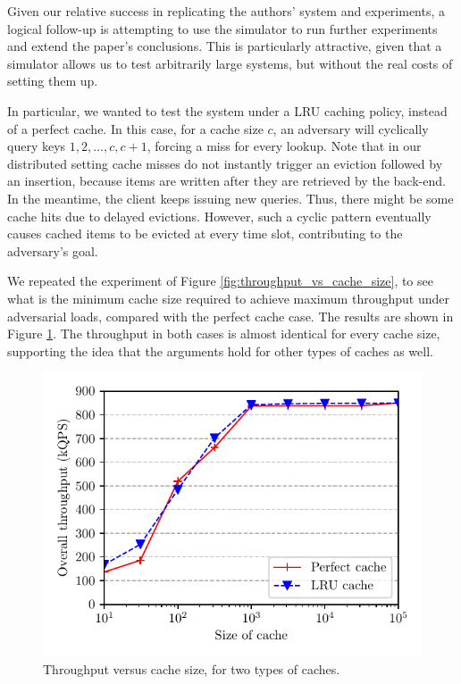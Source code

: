 \documentclass[10pt,letterpaper]{article}
\begin{document}
Given our relative success in replicating the authors' system and experiments, a logical follow-up is attempting to use the simulator to run further experiments and extend the paper's conclusions. This is particularly attractive, given that a simulator allows us to test arbitrarily large systems, but without the real costs of setting them up.

In particular, we wanted to test the system under a LRU caching policy, instead of a perfect cache. In this case, for a cache size $c$, an adversary will cyclically query keys $1, 2, \dots, c, c + 1$, forcing a miss for every lookup. Note that in our distributed setting cache misses do not instantly trigger an eviction followed by an insertion, because items are written after they are retrieved by the back-end. In the meantime, the client keeps issuing new queries. Thus, there might be some cache hits due to delayed evictions. However, such a cyclic pattern eventually causes cached items to be evicted at every time slot, contributing to the adversary's goal.

We repeated the experiment of Figure \ref{fig:throughput_vs_cache_size}, to see what is the minimum cache size required to achieve maximum throughput under adversarial loads, compared with the perfect cache case. The results are shown in Figure \ref{fig:throughput_vs_cache_size_lru}. The throughput in both cases is almost identical for every cache size, supporting the idea that the arguments hold for other types of caches as well.

\begin{figure}
	\centering	
	\includegraphics[scale=0.73]{img/throughput_vs_cache_size_lru.pdf}
	\caption{Throughput versus cache size, for two types of caches.}
	\label{fig:throughput_vs_cache_size_lru}
\end{figure}
\end{document}
